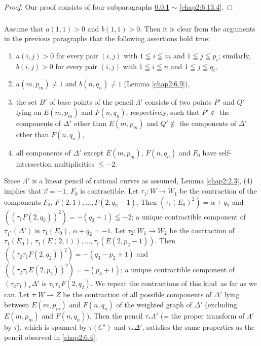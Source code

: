 \begin{proof}
Our proof consists of four subparagraphs \ref{chap2:6.13.1} $\sim$ \ref{chap2:6.13.4}.
\end{proof}

\subsubsection{}\label{chap2:6.13.1}
Assume that $a(1,1)>0$ and $b(1,1)>0$. Then it is clear from the
arguments in the previous paragraphs that the following assertions
hold true:
\begin{enumerate}
\renewcommand{\labelenumi}{\theenumi$^{\circ}$}
\item $a(i,j)>0$ for every pair $(i,j)$ with $1\leqq i\leqq m$ and
  $1\leqq j\leqq p_{i}$; similarly, $b(i,j)>0$ for every pair $(i,j)$
  with $1\leqq i\leqq n$ and $1\leqq j\leqq q_{i}$,

\item $a(m,p_{m})\neq 1$ and $b(n,q_{n})\neq 1$ (\cf Lemma
  \ref{chap2:6.9}),

\item the set $B'$ of base points of the pencil $\Lambda'$ consists of
  two points $P'$ and $Q'$ lying on $E(m,p_{m})$ and $F(n,q_{n})$,
  respectively, such that $P'\not\in$ the components of $\Delta'$
  other than $E(m,p_{m})$ and $Q'\not\in$ the components of $\Delta'$
  other than $F(n,q_{n})$,

\item all components of $\Delta'$ except $E(m,p_{m})$, $F(n,q_{n})$
  and $F_{0}$ have self-intersection multiplicities $\leqq -2$.
\end{enumerate}

Since $\Lambda'$ is a linear pencil of rational curves as assumed,
Lemma \ref{chap2:2.3}, (4) implies that $\beta=-1$, \iec $F_{0}$ is
contractible. Let $\tau_{1}:W\to W_{1}$ be the contraction of the
components $F_{0}$, $F(2,1),\ldots,F(2,q_{2}-1)$. Then
$(\tau_{1}(E_{0})^{2})=\alpha+q_{2}$ and
$((\tau_{1}F(2,q_{2}))^{2})=-(q_{3}+1)\leqq -2$; a unique contractible
component of $\tau_{1^{\ast}}(\Delta')$ is $\tau_{1}(E_{0})$, \iec
$\alpha+q_{2}=-1$. Let $\tau_{2}:W_{1}\to W_{2}$ be the contraction of
$\tau_{1}(E_{0})$,
$\tau_{1}(E(2,1)),\ldots,\tau_{1}(E(2,p_{2}-1))$. Then
$((\tau_{2}\tau_{1}F(2,q_{2}))^{2})=-(q_{3}-p_{2}+1)$ and
$((\tau_{2}\tau_{1}E(2,p_{2}))^{2})=-(p_{3}+1)$; a unique contractible
component of $(\tau_{2}\tau_{1})_{\ast}\Delta'$ is
$\tau_{2}\tau_{1}F(2,q_{2})$. We repeat the contractions of this
kind\pageoriginale\ as far as we can. Let $\tau:W\to Z$ be the
contraction of all possible components of $\Delta'$ lying between
$E(m,p_{m})$ and $F(n,q_{n})$ of the weighted graph of $\Delta'$
(excluding $E(m,p_{m})$ and $F(n,q_{n})$). Then the pencil
$\tau_{\ast}\Lambda'$ (= the proper transform of $\Lambda'$ by
$\tau$), which is spanned by $\tau(C')$ and $\tau_{\ast}\Delta'$,
satisfies the same properties as the pencil observed in \ref{chap2:6.4}.

